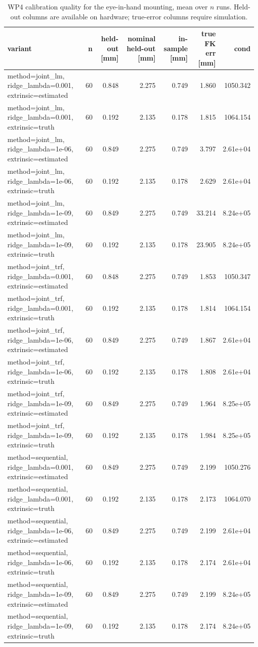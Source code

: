 \begin{table}[htbp]
  \centering
  \caption{WP4 calibration quality for the eye-in-hand mounting, mean over $n$ runs. Held-out columns are available on hardware; true-error columns require simulation.}
  \label{tab:wp4-summary-eye-in-hand}
  \begin{tabular}{lrrrrrr}
    \toprule
    variant & n & held-out [mm] & nominal held-out [mm] & in-sample [mm] & true FK err [mm] & cond \\
    \midrule
    method=joint\_lm, ridge\_lambda=0.001, extrinsic=estimated & 60 & 0.848 & 2.275 & 0.749 & 1.860 & 1050.342 \\
    method=joint\_lm, ridge\_lambda=0.001, extrinsic=truth & 60 & 0.192 & 2.135 & 0.178 & 1.815 & 1064.154 \\
    method=joint\_lm, ridge\_lambda=1e-06, extrinsic=estimated & 60 & 0.849 & 2.275 & 0.749 & 3.797 & 2.61e+04 \\
    method=joint\_lm, ridge\_lambda=1e-06, extrinsic=truth & 60 & 0.192 & 2.135 & 0.178 & 2.629 & 2.61e+04 \\
    method=joint\_lm, ridge\_lambda=1e-09, extrinsic=estimated & 60 & 0.849 & 2.275 & 0.749 & 33.214 & 8.24e+05 \\
    method=joint\_lm, ridge\_lambda=1e-09, extrinsic=truth & 60 & 0.192 & 2.135 & 0.178 & 23.905 & 8.24e+05 \\
    method=joint\_trf, ridge\_lambda=0.001, extrinsic=estimated & 60 & 0.848 & 2.275 & 0.749 & 1.853 & 1050.347 \\
    method=joint\_trf, ridge\_lambda=0.001, extrinsic=truth & 60 & 0.192 & 2.135 & 0.178 & 1.814 & 1064.154 \\
    method=joint\_trf, ridge\_lambda=1e-06, extrinsic=estimated & 60 & 0.849 & 2.275 & 0.749 & 1.867 & 2.61e+04 \\
    method=joint\_trf, ridge\_lambda=1e-06, extrinsic=truth & 60 & 0.192 & 2.135 & 0.178 & 1.808 & 2.61e+04 \\
    method=joint\_trf, ridge\_lambda=1e-09, extrinsic=estimated & 60 & 0.849 & 2.275 & 0.749 & 1.964 & 8.25e+05 \\
    method=joint\_trf, ridge\_lambda=1e-09, extrinsic=truth & 60 & 0.192 & 2.135 & 0.178 & 1.984 & 8.25e+05 \\
    method=sequential, ridge\_lambda=0.001, extrinsic=estimated & 60 & 0.849 & 2.275 & 0.749 & 2.199 & 1050.276 \\
    method=sequential, ridge\_lambda=0.001, extrinsic=truth & 60 & 0.192 & 2.135 & 0.178 & 2.173 & 1064.070 \\
    method=sequential, ridge\_lambda=1e-06, extrinsic=estimated & 60 & 0.849 & 2.275 & 0.749 & 2.199 & 2.61e+04 \\
    method=sequential, ridge\_lambda=1e-06, extrinsic=truth & 60 & 0.192 & 2.135 & 0.178 & 2.174 & 2.61e+04 \\
    method=sequential, ridge\_lambda=1e-09, extrinsic=estimated & 60 & 0.849 & 2.275 & 0.749 & 2.199 & 8.24e+05 \\
    method=sequential, ridge\_lambda=1e-09, extrinsic=truth & 60 & 0.192 & 2.135 & 0.178 & 2.174 & 8.24e+05 \\
    \bottomrule
  \end{tabular}
\end{table}
